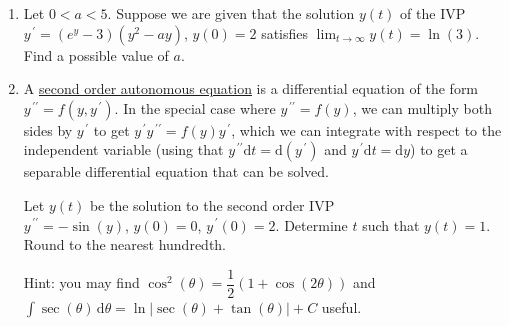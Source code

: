 \documentclass{ximera}
\begin{document}
\begin{enumerate}[label=(\arabic*)]

\newpage


\item Let $0<a<5$.  Suppose we are given that the solution $y(t)$ of the IVP $y^{\,\prime}=(e^y - 3)(y^2-ay)$, $y(0)=2$ satisfies $\displaystyle \lim_{t\rightarrow\infty}y(t)=\ln{(3)}$.  Find a possible value of $a$.  



\item  A \underline{second order autonomous equation} is a differential equation of the form $y^{\,\prime\prime}=f(y,y^{\,\prime})$. In the special case where $y^{\,\prime\prime}=f(y)$, we can multiply both sides by $y^{\,\prime}$ to get  $y^{\,\prime}y^{\,\prime\prime}=f(y)y^{\,\prime}$, which we can integrate with respect to the independent variable (using that $y^{\,\prime\prime} \mathrm{d}t=\mathrm{d}(y^{\,\prime})$ and $y^{\,\prime} \mathrm{d}t=\mathrm{d}y$)  to get a separable differential equation that can be solved.


Let $y(t)$ be the solution to the second order IVP \\$y^{\,\prime\prime}=-\sin (y)$, $y(0)=0$, $y^{\,\prime}(0)=2$.  Determine $t$ such that $y(t)=1$.  Round to the nearest hundredth.

Hint: you may find $\cos^2(\theta)=\dfrac{1}{2}\left(1+\cos (2\theta)\right)$ and\\ $\displaystyle \int \sec (\theta)\,\mathrm{d}\theta=\ln |\sec (\theta)+\tan (\theta)|+C$ useful.



\end{enumerate}
\end{document}
